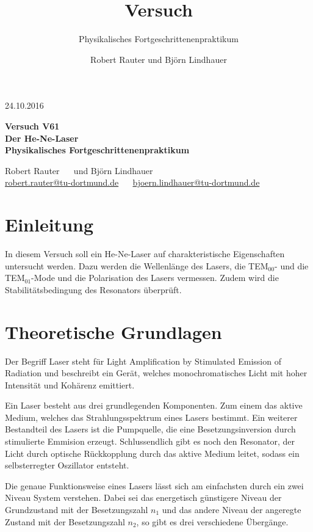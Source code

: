 \documentclass[captions=tableheading]{scrartcl}
\title{Versuch \versuchnummer\\ \versuchname}
\subtitle{Physikalisches Fortgeschrittenenpraktikum}
\author{Robert Rauter und Björn Lindhauer}
\date{\versuchdatum}
\newcommand{\versuchnummer}{V61}
\newcommand{\versuchname}{Der He-Ne-Laser}
\newcommand{\versuchdatum}{24.10.2016}
\begin{document}
\begin{titlepage}
{\large \versuchdatum}
\vspace{7cm}
\begin{center}
\textbf{\huge Versuch \versuchnummer}\\\vspace{0.5cm}
\textbf{\huge \versuchname}\\
\vspace{0.2cm}
\textbf{ Physikalisches Fortgeschrittenenpraktikum}\\
\vspace{9cm}

{\Large Robert Rauter \ \ \hspace{1.5cm} und \hspace{1.5cm} Björn Lindhauer}\\
{ \url{robert.rauter@tu-dortmund.de} \ \ \hspace{2cm} \url{bjoern.lindhauer@tu-dortmund.de}}
\end{center}
\end{titlepage}
\section{Einleitung}
In diesem Versuch soll ein He-Ne-Laser auf charakteristische Eigenschaften untersucht werden. Dazu werden die Wellenlänge des Lasers, die TEM$_{00}$- und die TEM$_{01}$-Mode und die Polarisation des Lasers vermessen. Zudem wird die Stabilitätsbedingung des Resonators überprüft.
\section{Theoretische Grundlagen}
Der Begriff Laser steht für Light Amplification by Stimulated Emission of Radiation und beschreibt ein Gerät, welches monochromatisches Licht mit hoher Intensität und Kohärenz emittiert.

Ein Laser besteht aus drei grundlegenden Komponenten. Zum einem das aktive Medium, welches das Strahlungsspektrum eines Lasers bestimmt.
Ein weiterer Bestandteil des Lasers ist die Pumpquelle, die eine Besetzungsinversion durch stimulierte Emmision erzeugt. 
Schlussendlich gibt es noch den Resonator, der Licht durch optische Rückkopplung durch das aktive Medium leitet, sodass ein selbsterregter Oszillator entsteht.

Die genaue Funktionsweise eines Lasers lässt sich am einfachsten durch ein zwei Niveau System verstehen. 
Dabei sei das energetisch günstigere Niveau der Grundzustand mit der Besetzungszahl $n_1$ und das andere Niveau der angeregte Zustand mit der Besetzungszahl $n_2$, so gibt es drei verschiedene Übergänge.
\end{document}
